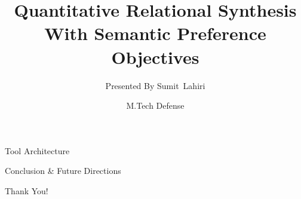 \documentclass[9pt]{beamer}
\title[M.Tech Defense] %
{Quantitative Relational Synthesis With Semantic Preference Objectives}
\author[Sumit Lahiri] %
{Presented By Sumit~Lahiri\inst{1}}
\institute[] %
{
	\inst{1}%
	PRAISE Group, CSE Dept. IIT Kanpur
}
\date[02/06/2025] %
{M.Tech Defense}
\begin{document}
\begin{frame}
    \titlepage
\end{frame}







\begin{frame}{Tool Architecture}

\end{frame}



\begin{frame}{Conclusion \& Future Directions}

\end{frame}

\begin{frame}{Thank You!}

\end{frame}
\end{document}
